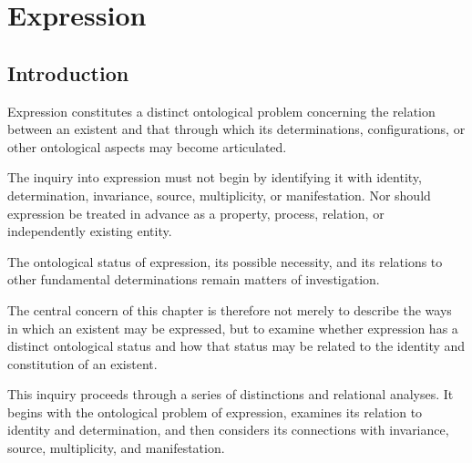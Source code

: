 
\chapter{Expression}
\label{ch:expression}


\newcommand{\ChapterFourTitle}{Expression}
\newcommand{\ChapterFourID}{VS.B01.P01.C04}



\section*{Introduction}

Expression constitutes a distinct ontological problem
concerning the relation between an existent and that
through which its determinations, configurations, or
other ontological aspects may become articulated.

The inquiry into expression must not begin by identifying
it with identity, determination, invariance, source,
multiplicity, or manifestation. Nor should expression
be treated in advance as a property, process, relation,
or independently existing entity.

The ontological status of expression, its possible
necessity, and its relations to other fundamental
determinations remain matters of investigation.

The central concern of this chapter is therefore not
merely to describe the ways in which an existent may
be expressed, but to examine whether expression has
a distinct ontological status and how that status
may be related to the identity and constitution
of an existent.

This inquiry proceeds through a series of distinctions
and relational analyses. It begins with the ontological
problem of expression, examines its relation to identity
and determination, and then considers its connections
with invariance, source, multiplicity, and manifestation.

